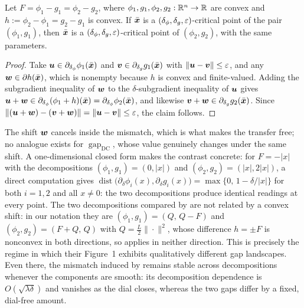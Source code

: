 \begin{lemma}
\label{lem:convex-shift-transfer}
Let $F=\phi_1-g_1=\phi_2-g_2$, where
$\phi_1,g_1,\phi_2,g_2:\mathbb{R}^n\to\mathbb{R}$ are convex and
$h:=\phi_2-\phi_1=g_2-g_1$ is convex. If $\bar{\bm{x}}$ is a
$(\delta_\phi,\delta_g,\varepsilon)$-critical point of the pair
$(\phi_1,g_1)$, then $\bar{\bm{x}}$ is a
$(\delta_\phi,\delta_g,\varepsilon)$-critical point of $(\phi_2,g_2)$, with
the same parameters.
\end{lemma}

\begin{proof}
Take $\bm{u}\in\partial_{\delta_\phi}\phi_1(\bar{\bm{x}})$ and
$\bm{v}\in\partial_{\delta_g}g_1(\bar{\bm{x}})$ with $\|\bm{u}-\bm{v}\|\le\varepsilon$, and
any $\bm{w}\in\partial h(\bar{\bm{x}})$, which is nonempty because $h$ is
convex and finite-valued. Adding the subgradient inequality of $\bm{w}$ to
the $\delta$-subgradient inequality of $\bm{u}$ gives
$\bm{u}+\bm{w}\in\partial_{\delta_\phi}(\phi_1+h)(\bar{\bm{x}})
=\partial_{\delta_\phi}\phi_2(\bar{\bm{x}})$, and likewise
$\bm{v}+\bm{w}\in\partial_{\delta_g}g_2(\bar{\bm{x}})$. Since
$\|(\bm{u}+\bm{w})-(\bm{v}+\bm{w})\|=\|\bm{u}-\bm{v}\|\le\varepsilon$, the claim follows.
\end{proof}

The shift $\bm{w}$ cancels inside the mismatch, which is what makes the
transfer free; no analogue exists for
$\operatorname{gap}_{\mathrm{DC}}$, whose value genuinely changes under
the same shift. A one-dimensional closed form makes the contrast
concrete: for $F=-|x|$ with the decompositions $(\phi_1,g_1)=(0,|x|)$
and $(\phi_2,g_2)=(|x|,2|x|)$, a direct computation gives
$\operatorname{dist}\bigl(\partial_\delta\phi_i(x),
\partial_\delta g_i(x)\bigr)=\max\{0,\,1-\delta/|x|\}$ for both $i=1,2$
and all $x\neq0$: the two decompositions produce identical readings at
every point. The two decompositions compared by \citet{maskan2025} are
not related by a convex shift: in our notation they are
$(\phi_1,g_1)=(Q,\,Q-F)$ and $(\phi_2,g_2)=(F+Q,\,Q)$ with
$Q=\frac{L}{2}\|\cdot\|^2$, whose difference $h=\pm F$ is nonconvex in
both directions, so  applies in neither
direction. This is precisely the regime in which their Figure~1
exhibits qualitatively different gap landscapes. Even there, the
mismatch induced by  remains stable across
decompositions whenever the components are smooth: its decomposition
dependence is $O(\sqrt{\lambda\delta})$ and vanishes as the dial
closes, whereas the two gaps differ by a fixed, dial-free amount.

